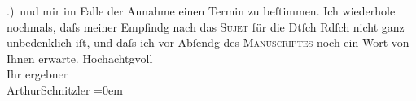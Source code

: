 \begin{ledgroupsized}[t]{13cm}
           .) und mir im Falle der Annahme einen Termin zu {\pb}beſtimmen.\pend
           \pstart
           Ich wiederhole nochmals, daſs meiner Empfindg nach das \textsc{Sujet} für die Dtſch Rdſch nicht ganz
               unbedenklich iſt, und daſs ich vor Abſendg des \textsc{Manuscriptes} noch ein Wort von Ihnen erwarte.\pend
           \pstart
           Hochachtgvoll{\\[\baselineskip]} Ihr ergebn\textcolor{gray}{er}{\\[\baselineskip]}\spacefill\mbox{ArthurSchnitzler}\pend
           \leftskip=0em{}
         
         \endnumbering{}\end{ledgroupsized}  \newcommand{\dateiname}{L01048}\newcommand{\titel}{Arthur Schnitzler an Julius Rodenberg, 21. 6. 1900}\newcommand{\editorInnen}{Martin Anton Müller und Gerd-Hermann Susen}
      